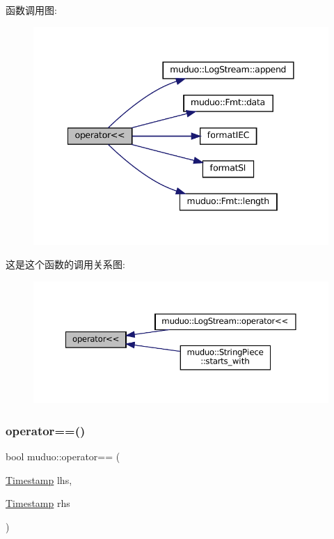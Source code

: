 函数调用图\+:
\nopagebreak
\begin{figure}[H]
\begin{center}
\leavevmode
\includegraphics[width=341pt]{namespacemuduo_a8306fbe1f821ddb82e4c161f936695b2_cgraph}
\end{center}
\end{figure}
这是这个函数的调用关系图\+:
\nopagebreak
\begin{figure}[H]
\begin{center}
\leavevmode
\includegraphics[width=350pt]{namespacemuduo_a8306fbe1f821ddb82e4c161f936695b2_icgraph}
\end{center}
\end{figure}
\mbox{\label{namespacemuduo_abf794c2f7edbea7af7ae48632eef1b84}} 
\subsubsection{\texorpdfstring{operator==()}{operator==()}\hspace{0.1cm}{\footnotesize\ttfamily [1/2]}}
{\footnotesize\ttfamily bool muduo\+::operator== (\begin{DoxyParamCaption}\item[{\hyperlink{classmuduo_1_1Timestamp}{Timestamp}}]{lhs,  }\item[{\hyperlink{classmuduo_1_1Timestamp}{Timestamp}}]{rhs }\end{DoxyParamCaption})\hspace{0.3cm}{\ttfamily [inline]}}



